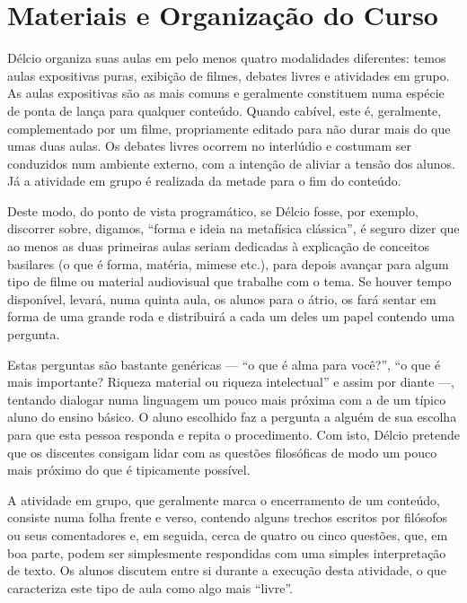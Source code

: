 \documentclass[12pt,a4paper]{article}
\begin{document}
	
	\newpage
	
	\section{Materiais e Organização do Curso}
	
    Délcio organiza suas aulas em pelo menos quatro modalidades diferentes: 
    temos aulas expositivas puras, exibição de filmes, debates livres e 
    atividades em grupo. As aulas expositivas são as mais comuns e geralmente 
    constituem numa espécie de ponta de lança para qualquer conteúdo. Quando 
    cabível, este é, geralmente, complementado por um filme, propriamente 
    editado para não durar mais do que umas duas aulas. Os debates livres 
    ocorrem no interlúdio e costumam ser conduzidos num ambiente externo, com 
    a intenção de aliviar a tensão dos alunos. Já a atividade em grupo é 
    realizada da metade para o fim do conteúdo. 
    
    Deste modo, do ponto de vista programático, se Délcio fosse, por exemplo, 
    discorrer sobre, digamos, ``forma e ideia na metafísica clássica'', 
    é seguro dizer que ao menos as duas primeiras aulas seriam dedicadas à 
    explicação de conceitos basilares (o que é forma, matéria, mimese etc.), 
    para depois avançar para algum tipo de filme ou material audiovisual 
    que trabalhe com o tema. Se houver tempo disponível, levará, numa quinta 
    aula, os alunos para o átrio, os fará sentar em forma de uma grande roda 
    e distribuirá a cada um deles um papel contendo uma pergunta. 
    
    Estas perguntas são bastante genéricas --- ``o que é alma para você?'', 
    ``o que é mais importante? Riqueza material ou riqueza intelectual'' e 
    assim por diante ---, tentando dialogar numa linguagem um pouco mais 
    próxima com a de um típico aluno do ensino básico. O aluno escolhido faz 
    a pergunta a alguém de sua escolha para que esta pessoa responda e repita 
    o procedimento. Com isto, Délcio pretende que os discentes consigam lidar 
    com as questões filosóficas de modo um pouco mais próximo do que 
    é tipicamente possível. 
    
    A atividade em grupo, que geralmente marca o encerramento de um conteúdo, 
    consiste numa folha frente e verso, contendo alguns trechos escritos por 
    filósofos ou seus comentadores e, em seguida, cerca de quatro ou cinco 
    questões, que, em boa parte, podem ser simplesmente respondidas com 
    uma simples interpretação de texto. Os alunos discutem entre si durante 
    a execução desta atividade, o que caracteriza este tipo de aula como algo 
    mais ``livre''. 
    
\end{document}
